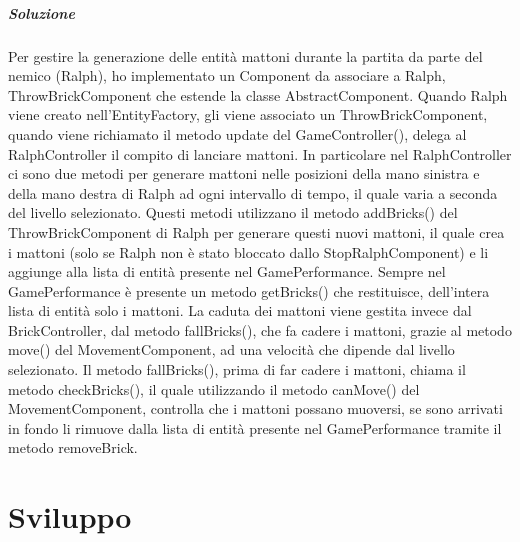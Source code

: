 \documentclass[a4paper,12pt]{report}
\begin{document}
\paragraph{Soluzione} Per gestire la generazione delle entità mattoni durante la partita da parte del nemico (Ralph), ho implementato un Component da associare a Ralph, ThrowBrickComponent che estende la classe AbstractComponent. Quando Ralph viene creato nell'EntityFactory, gli viene associato un ThrowBrickComponent, quando viene richiamato il metodo update del GameController(), delega al RalphController il compito di lanciare mattoni. In particolare nel RalphController ci sono due metodi per generare mattoni nelle posizioni della mano sinistra e della mano destra di Ralph ad ogni intervallo di tempo, il quale varia a seconda del livello selezionato. 
Questi metodi utilizzano il metodo addBricks() del ThrowBrickComponent di Ralph per generare questi nuovi mattoni, il quale crea i mattoni (solo se Ralph non è stato bloccato dallo StopRalphComponent) e li aggiunge alla lista di entità presente nel GamePerformance. Sempre nel GamePerformance è presente un metodo getBricks() che restituisce, dell'intera lista di entità solo i mattoni. La caduta dei mattoni viene gestita invece dal BrickController, dal metodo fallBricks(), che fa cadere i mattoni, grazie al metodo move() del MovementComponent, ad una velocità che dipende dal livello selezionato. Il metodo fallBricks(), prima di far cadere i mattoni, chiama il metodo checkBricks(), il quale utilizzando il metodo canMove() del MovementComponent, controlla che i mattoni possano muoversi, se sono arrivati in fondo li rimuove dalla lista di entità presente nel GamePerformance tramite il metodo removeBrick. 

\chapter{Sviluppo}
\end{document}
